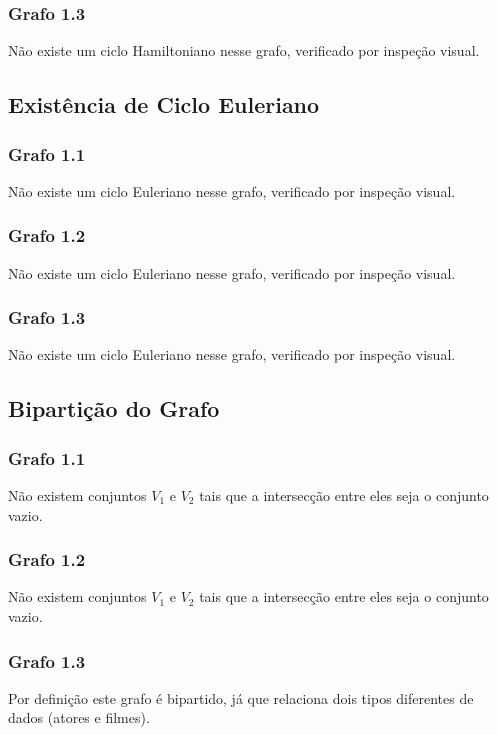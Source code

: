\documentclass{article}
\begin{document}
\subsubsection{Grafo 1.3}
Não existe um ciclo Hamiltoniano nesse grafo, verificado por inspeção visual.
\subsection{Existência de Ciclo Euleriano}
\subsubsection{Grafo 1.1}
Não existe um ciclo Euleriano nesse grafo, verificado por inspeção visual.
\subsubsection{Grafo 1.2}
Não existe um ciclo Euleriano nesse grafo, verificado por inspeção visual.
\subsubsection{Grafo 1.3}
Não existe um ciclo Euleriano nesse grafo, verificado por inspeção visual.
\subsection{Bipartição do Grafo}
\subsubsection{Grafo 1.1}
Não existem conjuntos {$V_1$} e {$V_2$} tais que a intersecção entre eles seja o conjunto vazio.
\subsubsection{Grafo 1.2}
Não existem conjuntos {$V_1$} e {$V_2$} tais que a intersecção entre eles seja o conjunto vazio.
\subsubsection{Grafo 1.3}
Por definição este grafo é bipartido, já que relaciona dois tipos diferentes de dados (atores e filmes).
\end{document}

